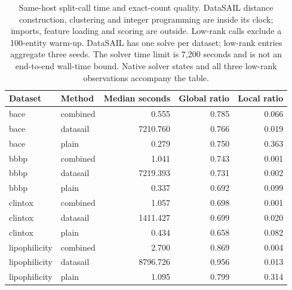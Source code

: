 \begin{table}[htbp]\centering\small
\begin{tabular}{llrrr}
\toprule
Dataset & Method & Median seconds & Global ratio & Local ratio \\
\midrule
bace & combined & 0.555 & 0.785 & 0.066 \\
bace & datasail & 7210.760 & 0.766 & 0.019 \\
bace & plain & 0.279 & 0.750 & 0.363 \\
bbbp & combined & 1.041 & 0.743 & 0.001 \\
bbbp & datasail & 7219.393 & 0.731 & 0.002 \\
bbbp & plain & 0.337 & 0.692 & 0.099 \\
clintox & combined & 1.057 & 0.698 & 0.001 \\
clintox & datasail & 1411.427 & 0.699 & 0.020 \\
clintox & plain & 0.434 & 0.658 & 0.082 \\
lipophilicity & combined & 2.700 & 0.869 & 0.004 \\
lipophilicity & datasail & 8796.726 & 0.956 & 0.013 \\
lipophilicity & plain & 1.095 & 0.799 & 0.314 \\
\bottomrule
\end{tabular}
\caption{Same-host split-call time and exact-count quality. DataSAIL distance construction, clustering and integer programming are inside its clock; imports, feature loading and scoring are outside. Low-rank calls exclude a 100-entity warm-up. DataSAIL has one solve per dataset; low-rank entries aggregate three seeds. The solver time limit is 7,200 seconds and is not an end-to-end wall-time bound. Native solver states and all three low-rank observations accompany the table.}\end{table}
